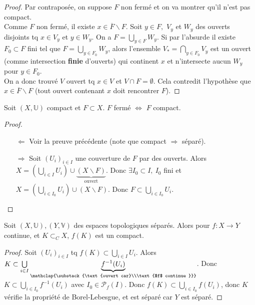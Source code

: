 \begin{proof}
    Par contraposée, on suppose $F$ non fermé et on va montrer qu'il n'est pas compact.\\
    Comme $F$ non fermé, il existe $x\in \overline{F}\backslash F.$ Soit $y\in F,$ $V_y$ et $W_y$ des ouverts disjoints tq $x\in V_y$ et $y\in W_y.$ On a $F=\bigcup\limits_{y\in F} W_y$. Si par l'absurde il existe $F_0\subset F$ fini tel que $F=\bigcup\limits_{y\in F_0} W_y$, alors l'ensemble $V_*=\bigcap\limits_{y\in F_0} V_y$ est un ouvert (comme intersection \textbf{finie} d'ouverts) qui continent $x$ et n'intersecte aucun $W_y$ pour $y\in F_0.$ \\
    On a donc trouvé $V$ ouvert tq $x\in V$ et $V\cap F=\emptyset $. Cela contredit l'hypothèse que $x\in \overline{F}\backslash F$ (tout ouvert contenant $x$ doit rencontrer $F$).
\end{proof}
\begin{corollaire}
    Soit $(X,\mathbb{U})$ compact et $F\subset X$. $F$ fermé $\Leftrightarrow $ $F$ compact.
\end{corollaire}
\begin{proof}
    \begin{itemize}
        \item[$\Leftarrow$] Voir la preuve précédente (note que compact $\Rightarrow $ séparé).
        \item[$\Rightarrow $] Soit $(U_i)_{i\in I}$ une couverture de $F$ par des ouverts. Alors \\
        $X=\left( \bigcup\limits_{i \in  I} U_i \right) \cup \underbrace{\left( X\backslash F\right)}_{\text{ouvert}}  $. Donc $\exists I_0\subset I,\ I_0$ fini et $X=\left( \bigcup\limits_{i \in  I_0} U_i \right) \cup \left(X\backslash F \right)$. Donc $F\subset \bigcup\limits_{i\in I_0} U_i.$
    \end{itemize}
\end{proof}
\begin{lemme}
    Soit $(X,\mathbb{U}),(Y,\mathbb{V})$ des espaces topologiques séparés. Alors pour $f : X \to Y$ continue, et $K\subset _CX$, $f(K)$ est un compact.
\end{lemme}
\begin{proof}
    Soit $(U_i)_{i \in I}$ tq $f(K)\subset \bigcup_{i\in I}U_i$. Alors $K\subset \bigcup\limits_{i \in I} \underbrace{f^{-1} (U_i)}_{ \mathclap{\substack{\text{ouvert car}\\\text{$f$ continue }}}}$. Donc \\
    $K\subset \bigcup\limits_{i\in I_0} f^{-1} (U_i)$ avec $I_0 \in \mathcal{P}_f(I)$. Donc $f(K)\subset \bigcup\limits_{i\in I_0} f(U_i)$, donc $K$ vérifie la propriété de Borel-Lebesgue, et est séparé car $Y$ est séparé.
\end{proof}
